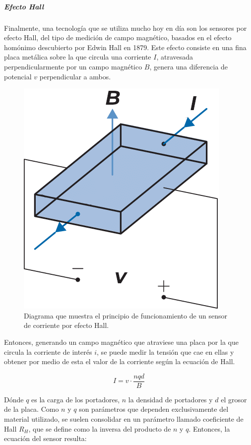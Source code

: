 \subparagraph{Efecto Hall}

Finalmente, una tecnología que se utiliza mucho hoy en día son los sensores por efecto Hall, del tipo de medición de campo magnético, basados en el efecto homónimo descubierto por Edwin Hall en 1879. Este efecto consiste en una fina placa metálica sobre la que circula una corriente $I$, atravesada perpendicularmente por un campo magnético $B$, genera una diferencia de potencial $v$ perpendicular a ambos.

\begin{figure}[h]
    \centering
    \includegraphics[scale=0.35]{Imagenes/Efecto Hall.png}
    \caption{Diagrama que muestra el principio de funcionamiento de un sensor de corriente por efecto Hall.}
    \label{efecto_hall}
\end{figure}

Entonces, generando un campo magnético que atraviese una placa por la que circula la corriente de interés $i$, se puede medir la tensión que cae en ellas y obtener por medio de esta el valor de la corriente según la ecuación de Hall.

\begin{equation}
    I = v\cdot\frac{nqd}{B}
\end{equation}

Dónde $q$ es la carga de los portadores, $n$ la densidad de portadores y $d$ el grosor de la placa. Como $n$ y $q$ son parámetros que dependen exclusivamente del material utilizado, se suelen consolidar en un parámetro llamado coeficiente de Hall $R_H$, que se define como la inversa del producto de $n$ y $q$. Entonces, la ecuación del sensor resulta:

